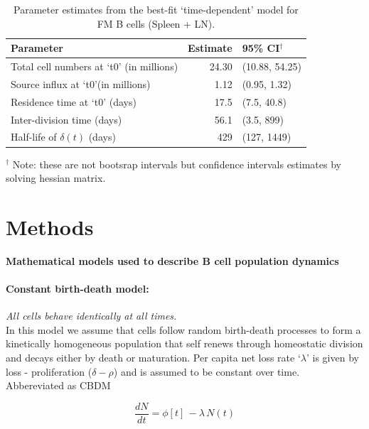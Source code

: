 \documentclass[11.5pt]{article}
\newcommand{\be}{\begin{equation}}
\newcommand{\ee}{\end{equation}}
\begin{document}
\begin{table}[h!]
	\begin{center}
		\renewcommand{\arraystretch}{1.25}
		\begin{tabular}{ l r l } 
			\toprule 
			\textbf{Parameter}  &  {\small Estimate}  &  {\small 95\% CI$^\dagger$} \\ 
			\toprule
			Total cell numbers at `t0' (in millions)      & 24.30      &  (10.88, 54.25)  \\ 
			Source influx at `t0'(in millions)           & 1.12      &  (0.95, 1.32)  \\
			Residence time at `t0' (days)      & 17.5      &  (7.5, 40.8)  \\ 
			Inter-division time (days)         & 56.1      &  (3.5, 899)  \\
			Half-life of $\delta(t)$ (days)    & 429       &  (127, 1449)  \\
			\hline
			\toprule 
		\end{tabular}
	\end{center}
	\caption{\small Parameter estimates from the best-fit `time-dependent' model for FM B cells (Spleen + LN).}
	$^\dagger$ \footnotesize Note: these are not bootsrap intervals but confidence intervals estimates by solving hessian matrix.
	\label{tab:FM-parestm}
\end{table} 


\clearpage

\section*{Methods}
\textbf{Mathematical models used to describe B cell population dynamics}
\paragraph*{Constant birth-death model:}
\textit{All cells behave identically at all times.} \\
In this model we assume that cells follow random birth-death processes to form a kinetically homogeneous population that self renews through homeostatic division and decays either by death or maturation. 
Per capita net loss rate `$\lambda$' is given by loss - proliferation ($\delta - \rho$)  and is assumed to be constant over time. \\
Abbereviated as CBDM

\be
\frac{dN}{dt} = \phi[t] \, - \lambda \, N(t)
\label{eq:SHM}
\ee
\end{document}
